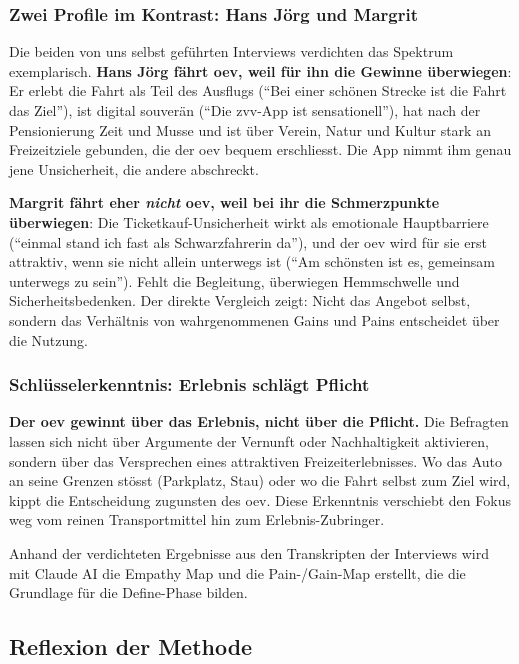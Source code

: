 \columnbreak
\subsubsection{Zwei Profile im Kontrast: Hans Jörg und Margrit}

Die beiden von uns selbst geführten Interviews verdichten das Spektrum exemplarisch. \textbf{Hans Jörg fährt \gls{oev}, weil für ihn die Gewinne überwiegen}: Er erlebt die Fahrt als Teil des Ausflugs (``Bei einer schönen Strecke ist die Fahrt das Ziel''), ist digital souverän (``Die \gls{zvv}-App ist sensationell''), hat nach der Pensionierung Zeit und Musse und ist über Verein, Natur und Kultur stark an Freizeitziele gebunden, die der \gls{oev} bequem erschliesst. Die App nimmt ihm genau jene Unsicherheit, die andere abschreckt.

\textbf{Margrit fährt eher \emph{nicht} \gls{oev}, weil bei ihr die Schmerzpunkte überwiegen}: Die Ticketkauf-Unsicherheit wirkt als emotionale Hauptbarriere (``einmal stand ich fast als Schwarzfahrerin da''), und der \gls{oev} wird für sie erst attraktiv, wenn sie nicht allein unterwegs ist (``Am schönsten ist es, gemeinsam unterwegs zu sein''). Fehlt die Begleitung, überwiegen Hemmschwelle und Sicherheitsbedenken. Der direkte Vergleich zeigt: Nicht das Angebot selbst, sondern das Verhältnis von wahrgenommenen Gains und Pains entscheidet über die Nutzung.

\subsubsection{Schlüsselerkenntnis: Erlebnis schlägt Pflicht}

\textbf{Der \gls{oev} gewinnt über das Erlebnis, nicht über die Pflicht.} Die Befragten lassen sich nicht über Argumente der Vernunft oder Nachhaltigkeit aktivieren, sondern über das Versprechen eines attraktiven Freizeiterlebnisses. Wo das Auto an seine Grenzen stösst (Parkplatz, Stau) oder wo die Fahrt selbst zum Ziel wird, kippt die Entscheidung zugunsten des \gls{oev}. Diese Erkenntnis verschiebt den Fokus weg vom reinen Transportmittel hin zum Erlebnis-Zubringer.

Anhand der verdichteten Ergebnisse aus den Transkripten der Interviews wird mit Claude AI die Empathy Map und die Pain-/Gain-Map erstellt, die die Grundlage für die Define-Phase bilden.

\columnbreak
\subsection{Reflexion der Methode}

